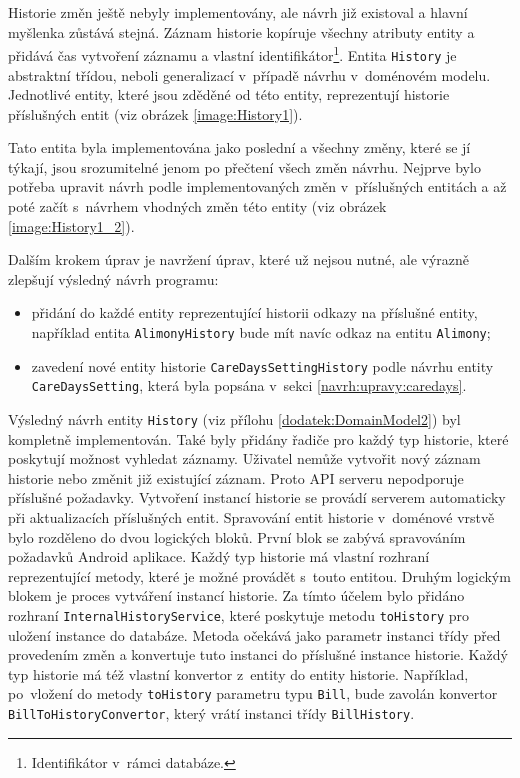        Historie změn ještě nebyly implementovány, ale návrh již existoval a hlavní myšlenka zůstává stejná. Záznam historie kopíruje všechny atributy entity a přidává čas vytvoření záznamu a vlastní identifikátor\footnote{Identifikátor v~rámci databáze.}. Entita \verb|History| je abstraktní třídou, neboli generalizací v~případě návrhu v~doménovém modelu. Jednotlivé entity, které jsou zděděné od této entity, reprezentují historie příslušných entit (viz obrázek \ref{image:History1}). 
    
        Tato entita byla implementována jako poslední a všechny změny, které se jí týkají, jsou srozumitelné jenom po přečtení všech změn návrhu. Nejprve bylo potřeba upravit návrh podle implementovaných změn v~příslušných entitách a až poté začít s~návrhem vhodných změn této entity (viz obrázek \ref{image:History1_2}).
        
        Dalším krokem úprav je navržení úprav, které už nejsou nutné, ale výrazně zlepšují výsledný návrh programu:
        \begin{itemize}
            \item přidání do každé entity reprezentující historii odkazy na příslušné entity, například entita \texttt{AlimonyHistory} bude mít navíc odkaz na entitu \texttt{Alimony};
            \item zavedení nové entity historie \texttt{CareDaysSettingHistory} podle návrhu entity \texttt{CareDaysSetting}, která byla popsána v~sekci \ref{navrh:upravy:caredays}.
        \end{itemize}
        Výsledný návrh entity \verb|History| (viz přílohu \ref{dodatek:DomainModel2}) byl kompletně implementován. Také byly přidány řadiče pro každý typ historie, které poskytují možnost vyhledat záznamy. Uživatel nemůže vytvořit nový záznam historie nebo změnit již existující záznam. Proto API serveru nepodporuje příslušné požadavky. Vytvoření instancí historie se provádí serverem automaticky při aktualizacích příslušných entit.
        Spravování entit historie v~doménové vrstvě bylo rozděleno do dvou logických bloků. První blok se zabývá spravováním požadavků Android aplikace. Každý typ historie má vlastní rozhraní reprezentující metody, které je možné provádět s~touto entitou. Druhým logickým blokem je proces vytváření instancí historie. Za tímto účelem bylo přidáno rozhraní \verb|InternalHistoryService|, které poskytuje metodu \verb|toHistory| pro uložení instance do databáze.
        Metoda očekává jako parametr instanci třídy před provedením změn a konvertuje tuto instanci do příslušné instance historie. Každý typ historie má též vlastní konvertor z~entity do entity historie. Například, po~vložení do metody \verb|toHistory| parametru typu \verb|Bill|, bude zavolán konvertor \verb|BillToHistoryConvertor|, který vrátí instanci třídy \verb|BillHistory|. 

